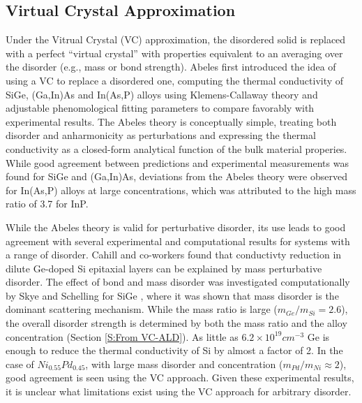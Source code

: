 \documentclass[aps,prb,onecolumn,preprint,superscriptaddress,amsmath,amssymb,floatfix]{revtex4}
\begin{document}
\subsection{\label{S:Virtual Crystal}Virtual Crystal Approximation}

Under the Vitrual Crystal (VC) approximation, the disordered 
solid is replaced with a perfect “virtual crystal” with properties 
equivalent to an averaging over the disorder (e.g., mass or bond 
strength).\cite{abeles_lattice_1963}
Abeles first introduced the idea of using a VC to 
replace a disordered one, computing the
thermal conductivity of SiGe, (Ga,In)As and In(As,P) alloys using  
Klemens-Callaway theory
\cite{klemens_scattering_1955,klemens_thermal_1957,callaway_model_1959} 
and adjustable phenomological fitting parameters 
to compare favorably with experimental results. 
The Abeles theory is conceptually simple,  
treating both
disorder and anharmonicity as perturbations and expressing the thermal 
conductivity as a closed-form analytical function of the bulk material 
properies.\cite{abeles_lattice_1963} 
While good agreement between predictions and experimental measurements 
was found for SiGe and (Ga,In)As, deviations from the Abeles theory 
were observed for In(As,P) alloys at large concentrations, which was 
attributed to the high mass ratio of 3.7 for InP.
\cite{abeles_lattice_1963}

While the Abeles theory is valid for 
perturbative disorder, its use leads to good agreement with
several experimental and computational results for systems with 
a range of disorder. 
Cahill and co-workers found that conductivty reduction in dilute 
Ge-doped Si epitaxial layers 
can be explained by mass perturbative disorder.
\cite{cahill_thermal_2004,cahill_thermal_2005} 
The effect of bond and mass disorder was investigated computationally 
by Skye and 
Schelling for SiGe \cite{skye_thermal_2008}, 
where it was shown that mass disorder is 
the dominant scattering mechanism. 
While the mass ratio is large ($m_{Ge}/m_{Si} = 2.6$),  
the overall disorder strength is determined by both the mass ratio and 
the alloy concentration (Section \ref{S:From VC-ALD}). 
As little as $6.2\times10^{19} cm^{-3}$ Ge  
is enough to reduce the thermal conductivity of 
Si by almost a factor of 2.\cite{cahill_thermal_2004} 
In the
case of $Ni_{0.55}Pd_{0.45}$, with large mass disorder and 
concentration ($m_{Pd}/m_{Ni} \approx 2$), 
good agreement is seen using the VC approach.
\cite{kamitakahara_vibrations_1974} 
Given these experimental results, it is unclear what limitations exist 
using the VC approach for arbitrary disorder.
\end{document}
